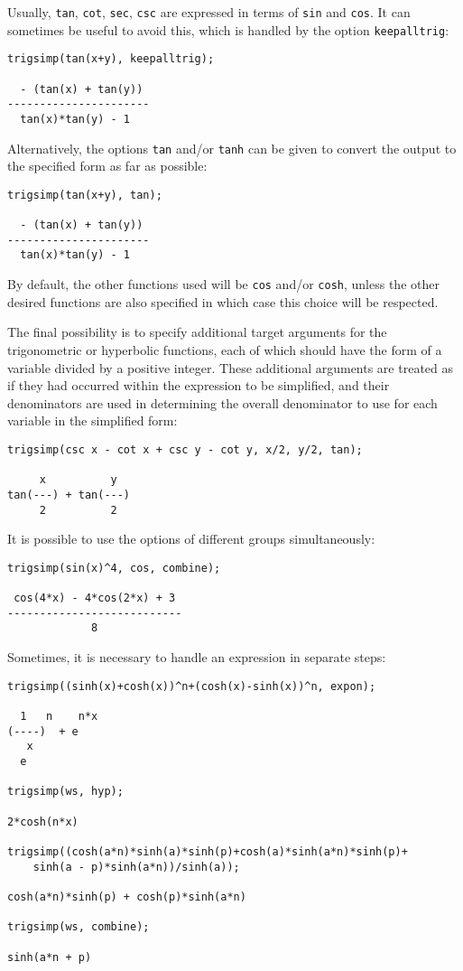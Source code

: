 \documentclass[11pt]{article}
\begin{document}
Usually, \texttt{tan}, \texttt{cot}, \texttt{sec}, \texttt{csc} are
expressed in terms of \texttt{sin} and \texttt{cos}.  It can sometimes
be useful to avoid this, which is handled by the option
\texttt{keepalltrig}:
\begin{verbatim}
trigsimp(tan(x+y), keepalltrig);

  - (tan(x) + tan(y))
----------------------
  tan(x)*tan(y) - 1
\end{verbatim}
Alternatively, the options \texttt{tan} and/or \texttt{tanh} can be
given to convert the output to the specified form as far as possible:
\begin{verbatim}
trigsimp(tan(x+y), tan);

  - (tan(x) + tan(y))
----------------------
  tan(x)*tan(y) - 1
\end{verbatim}
By default, the other functions used will be \texttt{cos} and/or
\texttt{cosh}, unless the other desired functions are also specified
in which case this choice will be respected.

The final possibility is to specify additional target arguments for
the trigonometric or hyperbolic functions, each of which should have
the form of a variable divided by a positive integer.  These
additional arguments are treated as if they had occurred within the
expression to be simplified, and their denominators are used in
determining the overall denominator to use for each variable in the
simplified form:
\begin{verbatim}
trigsimp(csc x - cot x + csc y - cot y, x/2, y/2, tan);

     x          y
tan(---) + tan(---)
     2          2
\end{verbatim}

It is possible to use the options of different groups simultaneously:
\begin{verbatim}
trigsimp(sin(x)^4, cos, combine);

 cos(4*x) - 4*cos(2*x) + 3
---------------------------
             8
\end{verbatim}

Sometimes, it is necessary to handle an expression in separate steps:
\begin{verbatim}
trigsimp((sinh(x)+cosh(x))^n+(cosh(x)-sinh(x))^n, expon);

  1   n    n*x
(----)  + e
   x
  e

trigsimp(ws, hyp);

2*cosh(n*x)

trigsimp((cosh(a*n)*sinh(a)*sinh(p)+cosh(a)*sinh(a*n)*sinh(p)+
    sinh(a - p)*sinh(a*n))/sinh(a));

cosh(a*n)*sinh(p) + cosh(p)*sinh(a*n)

trigsimp(ws, combine);

sinh(a*n + p)
\end{verbatim}
\end{document}
